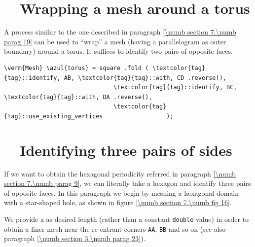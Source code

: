 \section{~~Wrapping a mesh around a torus}\label{\numb section 7.\numb parag 20}

A process similar to the one described in paragraph \ref{\numb section 7.\numb parag 19}
can be used to ``wrap'' a mesh (having a parallelogram as outer boundary) around
a torus.
It suffices to identify two pairs of opposite faces.
\vskip 5mm

\begin{Verbatim}[commandchars=\\\{\},formatcom=\small\tt,frame=single,
   label=parag-\ref{\numb section 7.\numb parag 20}.cpp,rulecolor=\color{moldura},
   baselinestretch=0.94,framesep=2mm                                             ]
   \verm{Mesh} \azul{torus} = square .fold ( \textcolor{tag}{tag}::identify, AB, \textcolor{tag}{tag}::with, CD .reverse(),
                               \textcolor{tag}{tag}::identify, BC, \textcolor{tag}{tag}::with, DA .reverse(),
                               \textcolor{tag}{tag}::use_existing_vertices                  );
\end{Verbatim}


\section{~~Identifying three pairs of sides}\label{\numb section 7.\numb parag 21}

If we want to obtain the hexagonal periodicity referred in paragraph
\ref{\numb section 7.\numb parag 9}, we can literally take a hexagon and
identify three pairs of opposite faces.
In this paragraph we begin by meshing a hexagonal domain with a star-shaped hole,
as shown in figure \ref{\numb section 7.\numb fig 16}.

We provide a {\small\tt{}} as desired length
(rather than a constant {\small\tt double} value) in order to obtain a finer mesh near the
re-entrant corners {\small\tt AA}, {\small\tt BB} and so on
(see also paragraph \ref{\numb section 3.\numb parag 23}).

